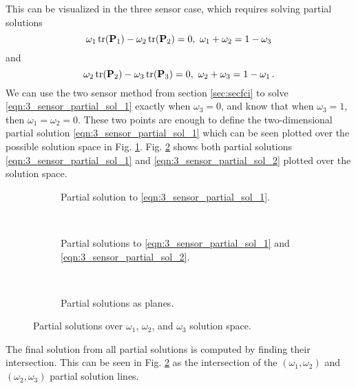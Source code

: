 \documentclass[letterpaper, 10 pt, journal, twoside]{ieeetran}  %
\begin{document}
This can be visualized in the three sensor case, which requires solving partial solutions
\begin{equation}
   \omega_1 \operatorname{tr}({{\mathbf{P}}}_1) - \omega_2 \operatorname{tr}({{\mathbf{P}}}_2) = 0,\ \omega_1+\omega_2=1-\omega_3 \label{eqn:3_sensor_partial_sol_1}
\end{equation}
and
\begin{equation}
   \omega_2 \tr(\mP_2) - \omega_3 \tr(\mP_3) = 0,\ \omega_2+\omega_3=1-\omega_1\,. \label{eqn:3_sensor_partial_sol_2}
\end{equation}
We can use the two sensor method from section \ref{sec:secfci} to solve \eqref{eqn:3_sensor_partial_sol_1} exactly when $\omega_3=0$, and know that when $\omega_3=1$, then $\omega_1=\omega_2=0$. These two points are enough to define the two-dimensional partial solution \eqref{eqn:3_sensor_partial_sol_1} which can be seen plotted over the possible solution space in Fig. \ref{fig:3_sensor_partial_sol}. Fig. \ref{fig:3_sensor_partial_sols} shows both partial solutions \eqref{eqn:3_sensor_partial_sol_1} and \eqref{eqn:3_sensor_partial_sol_2} plotted over the solution space.
\begin{figure*}[tb]
   \begin{subfigure}[t]{0.3\textwidth}
      \vspace{-5pt}
      \begin{center}
         
      \end{center}
      \vspace{-10pt}
      \caption{Partial solution to \eqref{eqn:3_sensor_partial_sol_1}.}
      \label{fig:3_sensor_partial_sol}
   \end{subfigure}
   ~
   \begin{subfigure}[t]{0.3\textwidth}
      \vspace{-5pt}
      \begin{center}
         
      \end{center}
      \vspace{-10pt}
      \caption{Partial solutions to \eqref{eqn:3_sensor_partial_sol_1} and \eqref{eqn:3_sensor_partial_sol_2}.}
      \label{fig:3_sensor_partial_sols}
   \end{subfigure}
   ~
   \begin{subfigure}[t]{0.3\textwidth}
      \vspace{-5pt}
      \begin{center}
         
      \end{center}
      \vspace{-10pt}
      \caption{Partial solutions as planes.}
      \label{fig:3sen_planes}
   \end{subfigure}
   \caption{Partial solutions over $\omega_1$, $\omega_2$, and $\omega_3$ solution space.}
   \vspace{-\baselineskip}
   \label{fig:partial_sols_and_planes}
\end{figure*}
The final solution from all partial solutions is computed by finding their intersection. This can be seen in Fig. \ref{fig:3_sensor_partial_sols} as the intersection of the $(\omega_1,\omega_2)$ and $(\omega_2,\omega_3)$ partial solution lines.
\end{document}
